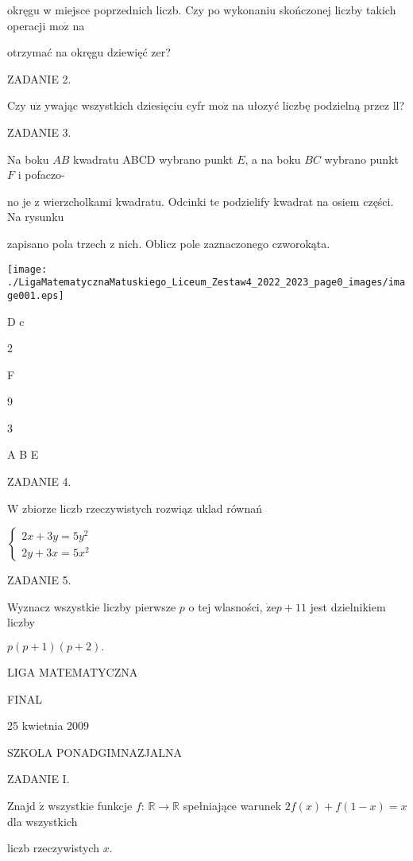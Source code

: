\documentclass[a4paper,12pt]{article}
\begin{document}
okręgu w miejsce poprzednich liczb. Czy po wykonaniu skończonej liczby takich operacji $\mathrm{m}\mathrm{o}\dot{\mathrm{z}}$ na

otrzymać na okręgu dziewięć zer?

ZADANIE 2.

Czy $\mathrm{u}\dot{\mathrm{z}}$ ywając wszystkich dziesięciu cyfr $\mathrm{m}\mathrm{o}\dot{\mathrm{z}}$ na ułozyć liczbę podzielną przez ll?

ZADANIE 3.

Na boku $AB$ kwadratu ABCD wybrano punkt $E$, a na boku $BC$ wybrano punkt $F$ i pofaczo-

no je z wierzcholkami kwadratu. Odcinki te podzielify kwadrat na osiem części. Na rysunku

zapisano pola trzech z nich. Oblicz pole zaznaczonego czworokąta.
\begin{center}
\texttt{[image: ./LigaMatematycznaMatuskiego\_Liceum\_Zestaw4\_2022\_2023\_page0\_images/image001.eps]}
\end{center}
D  c

2

F

9

3

A  B  E

ZADANIE 4.

$\mathrm{W}$ zbiorze liczb rzeczywistych rozwiąz uklad równań

$\left\{\begin{array}{l}
2x+3y=5y^{2}\\
2y+3x=5x^{2}
\end{array}\right.$

ZADANIE 5.

Wyznacz wszystkie liczby pierwsze $p$ o tej wlasności, $\dot{\mathrm{z}}\mathrm{e}p+11$ jest dzielnikiem liczby

$p(p+1)(p+2).$






LIGA MATEMATYCZNA

FINAL

25 kwietnia 2009

SZKOLA PONADGIMNAZJALNA

ZADANIE I.

Znajd $\acute{\mathrm{z}}$ wszystkie funkcje $f$: $\mathbb{R}\rightarrow \mathbb{R}$ spełniające warunek $2f(x)+f(1-x)=x$ dla wszystkich

liczb rzeczywistych $x.$
\end{document}
